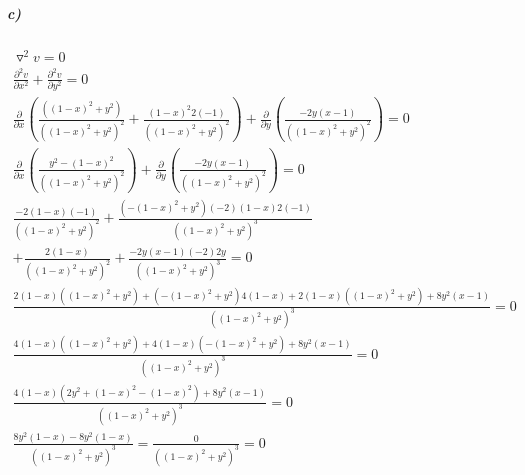 \documentclass[11pt, A4paper,norsk]{article}
\begin{document}
			\subparagraph{c)}
				\begin{gather}
\triangledown^2 v = 0 \\
\frac{\partial^2 v}{\partial x^2} + \frac{\partial^2 v}{\partial y^2} = 0 \\
\frac{\partial}{\partial x} \left( \frac{\left( (1 - x)^2 + y^2 \right)}{\left( (1 - x)^2 + y^2 \right)^2} + \frac{(1 - x)^2 2(-1)}{\left( (1 - x)^2 + y^2 \right)^2} \right) + \frac{\partial}{\partial y} \left( \frac{-2y(x - 1)}{\left( (1 - x)^2 + y^2 \right)^2} \right) = 0 \nonumber \\
\frac{\partial}{\partial x} \left( \frac{y^2 - (1 - x)^2}{\left( (1 - x)^2 + y^2 \right)^2} \right) + \frac{\partial}{\partial y} \left( \frac{-2y(x - 1)}{\left( (1 - x)^2 + y^2 \right)^2} \right) = 0 \\
\frac{-2(1 - x)(-1)}{\left( (1 - x)^2 + y^2 \right)^2} + \frac{\left( - (1 - x)^2 + y^2 \right)(-2)(1 - x)2(-1)}{\left( (1 - x)^2 + y^2 \right)^3} \nonumber \\
 + \frac{2(1 - x)}{\left( (1 - x)^2 + y^2 \right)^2} + \frac{-2y(x - 1)(-2)2y}{\left( (1 - x)^2 + y^2 \right)^3} = 0 \\
\frac{2(1 - x)\left( (1 - x)^2 + y^2 \right) + \left( - (1 - x)^2 + y^2 \right)4(1 - x) + 2(1 - x)\left( (1 - x)^2 + y^2 \right) + 8y^2(x - 1)}{\left( (1 - x)^2 + y^2 \right)^3} = 0 \nonumber \\
\frac{4(1 - x)\left( (1 - x)^2 + y^2 \right) + 4(1 - x)\left( - (1 - x)^2 + y^2 \right) + 8y^2(x - 1)}{\left( (1 - x)^2 + y^2 \right)^3} = 0 \nonumber \\
\frac{4(1 - x)\left( 2y^2 + (1 - x)^2 - (1 - x)^2 \right) + 8y^2(x - 1)}{\left( (1 - x)^2 + y^2 \right)^3} = 0 \\
\frac{8y^2(1 - x) - 8y^2(1 - x)}{\left( (1 - x)^2 + y^2 \right)^3} = \frac{0}{\left( (1 - x)^2 + y^2 \right)^3} = 0
				\end{gather}
\end{document}
